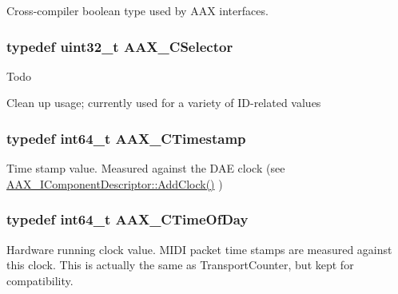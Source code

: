 Cross-\/compiler boolean type used by A\+A\+X interfaces. 

\hypertarget{a00149_aeaf9b387f902c50a8360ff423f4a1f23}{}
\subsubsection[{A\+A\+X\+\_\+\+C\+Selector}]{\setlength{\rightskip}{0pt plus 5cm}typedef uint32\+\_\+t {\bf A\+A\+X\+\_\+\+C\+Selector}}\label{a00149_aeaf9b387f902c50a8360ff423f4a1f23}
\begin{DoxyRefDesc}{Todo}
\item[\hyperlink{a00382__todo000005}{Todo}]Clean up usage; currently used for a variety of I\+D-\/related values \end{DoxyRefDesc}
\hypertarget{a00149_aae7325dbfa53a983f208a68cb563fba5}{}
\subsubsection[{A\+A\+X\+\_\+\+C\+Timestamp}]{\setlength{\rightskip}{0pt plus 5cm}typedef int64\+\_\+t {\bf A\+A\+X\+\_\+\+C\+Timestamp}}\label{a00149_aae7325dbfa53a983f208a68cb563fba5}


Time stamp value. Measured against the D\+A\+E clock (see \hyperlink{a00088_a59727dee1043fcd7f14da130ab254445}{A\+A\+X\+\_\+\+I\+Component\+Descriptor\+::\+Add\+Clock()} ) 

\hypertarget{a00149_a46542a1dcccdcc3b4260a9926edf8a2a}{}
\subsubsection[{A\+A\+X\+\_\+\+C\+Time\+Of\+Day}]{\setlength{\rightskip}{0pt plus 5cm}typedef int64\+\_\+t {\bf A\+A\+X\+\_\+\+C\+Time\+Of\+Day}}\label{a00149_a46542a1dcccdcc3b4260a9926edf8a2a}


Hardware running clock value. M\+I\+D\+I packet time stamps are measured against this clock. This is actually the same as Transport\+Counter, but kept for compatibility. 

